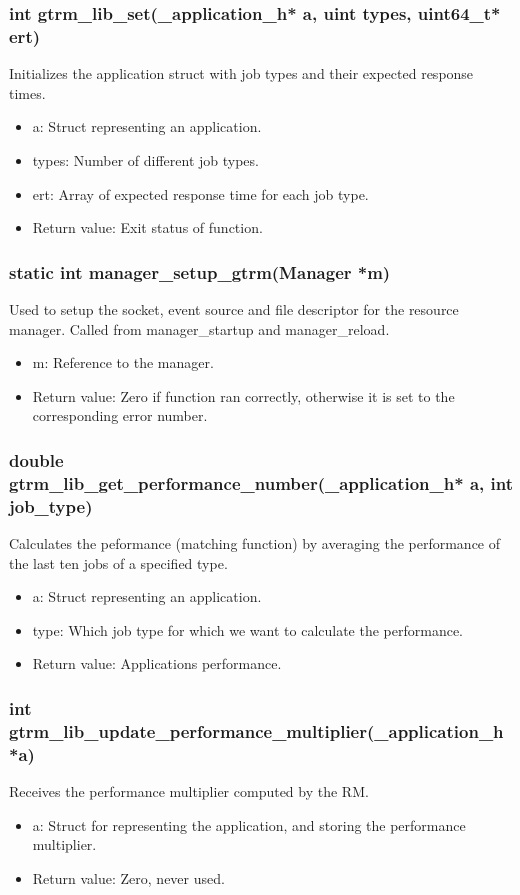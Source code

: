\documentclass[nobiblatex]{LTHthesis}
\begin{document}
\subsubsection{int gtrm\_lib\_set(\_application\_h* a, uint types, uint64\_t* ert)}
Initializes the application struct with job types and their expected response times.
\begin{itemize}
\item a: Struct representing an application.
\item types: Number of different job types.
\item ert: Array of expected response time for each job type.
\item Return value: Exit status of function.
\end{itemize}

\subsubsection{static int manager\_setup\_gtrm(Manager *m)}
Used to setup the socket, event source and file descriptor for the resource manager. Called from manager\_startup and manager\_reload.
\begin{itemize}
\item m: Reference to the manager.
\item Return value: Zero if function ran correctly, otherwise it is set to the corresponding error number.
\end{itemize}

\subsubsection{double gtrm\_lib\_get\_performance\_number(\_application\_h* a, int job\_type)}
Calculates the peformance (matching function) by averaging the performance of the last ten jobs of a specified type.
\begin{itemize}
\item a: Struct representing an application.
\item type: Which job type for which we want to calculate the performance.
\item Return value: Applications performance.
\end{itemize}

\subsubsection{int gtrm\_lib\_update\_performance\_multiplier(\_application\_h *a)}
Receives the performance multiplier computed by the RM.
\begin{itemize}
\item a: Struct for representing the application, and storing the performance multiplier.
\item Return value: Zero, never used.
\end{itemize}
\end{document}
